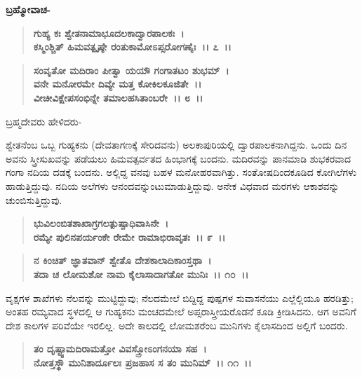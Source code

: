 \begin{flushleft}
\textbf{ಬ್ರಹ್ಮೋವಾಚ-}
\end{flushleft}

\begin{verse}
\textbf{ಗುಹ್ಯ ಕಃ ಶ್ವೇತನಾಮಾಭೂದಲಕಾದ್ವಾರಪಾಲಕಃ~।}\\\textbf{ಕಸ್ಮಿಂಶ್ಚಿತ್ ಹಿಮವತ್ಪೃಷ್ಠೇ ರಂತುಕಾಮೋಽಪ್ಸರೋಗಣೈಃ~।। ೭~।। }
\end{verse}

\begin{verse}
\textbf{ಸಂವೃತೋ ಮದಿರಾಂ ಪೀತ್ವಾ ಯಯೌ ಗಂಗಾತಟಂ ಶುಭಮ್~।}\\\textbf{ವನೇ ಮನೋರಮೇ ದಿವ್ಯೇ ಮತ್ತ ಕೋಕಿಲಕೂಜಿತೇ~।।}\\\textbf{ವೀಚೀವಿಕ್ಷೇಪಸಂಭಿನ್ನೇ ತಮಾಲಹಸಿತಾಂಬರೇ~।। ೮~।।}
\end{verse}

\begin{flushleft}
 ಬ್ರಹ್ಮದೇವರು ಹೇಳಿದರು-
\end{flushleft}

ಶ್ವೇತನೆಂಬ ಒಬ್ಬ ಗುಹ್ಯಕನು (ದೇವತಾಗಣಕ್ಕೆ ಸೇರಿದವನು) ಅಲಕಾಪುರಿಯಲ್ಲಿ ದ್ವಾರಪಾಲಕನಾಗಿದ್ದನು. ಒಂದು ದಿನ ಅವನು ಸ್ತ್ರೀಸುಖವನ್ನು ಪಡೆಯಲು ಹಿಮವತ್ಪರ್ವತದ ಹಿಂಭಾಗಕ್ಕೆ ಬಂದನು. ಮದಿರವನ್ನು ಪಾನಮಾಡಿ ಶುಭಕರವಾದ ಗಂಗಾ ನದಿಯ ದಡಕ್ಕೆ ಬಂದನು. ಅಲ್ಲಿದ್ದ ವನವು ಬಹಳ ಮನೋಹರವಾಗಿತ್ತು. ಸಂತೋಷದಿಂದಕೂಡಿದ ಕೋಗಿಲೆಗಳು ಹಾಡುತ್ತಿದ್ದುವು. ನದಿಯ ಅಲೆಗಳು ಆನಂದವನ್ನುಂಟುಮಾಡುತ್ತಿದ್ದುವು. ಅನೇಕ ವಿಧವಾದ ಮರಗಳು ಆಕಾಶವನ್ನು ಚುಂಬಿಸುತ್ತಿದ್ದುವು.

\begin{verse}
\textbf{ಭುವಿಲಂಬಿತಶಾಖಾಗ್ರಗಲತ್ಪುಷ್ಪಾಧಿವಾಸಿನೇ~।}\\\textbf{ರಮ್ಯೇ ಪುಲಿನಪರ್ಯಂಕೇ ರೇಮೇ ರಾಮಾಭಿರಾವೃತಃ~।। ೯~।। }
\end{verse}

\begin{verse}
\textbf{ನ ಕಿಂಚಿತ್ ಜ್ಞಾತವಾನ್ ಶ್ವೇತೊ ದೇಶಕಾಲಾದಿಕಾಂಸ್ತಥಾ~।}\\\textbf{ತದಾ ಚ ಲೋಮಶೋ ನಾಮ ಕೈಲಾಸಾದಾಗತೋ ಮುನಿಃ~।। ೧೦~।।}
\end{verse}

ವೃಕ್ಷಗಳ ಶಾಖೆಗಳು ನೆಲವನ್ನು ಮುಟ್ಟಿದ್ದುವು; ನೆಲದಮೇಲೆ ಬಿದ್ದಿದ್ದ ಪುಷ್ಪಗಳ ಸುವಾಸನೆಯು ಎಲ್ಲೆಲ್ಲಿಯೂ ಹರಡಿತ್ತು; ಅಂತಹ ರಮ್ಯವಾದ ಸ್ಥಳದಲ್ಲಿ ಆ ಗುಹ್ಯಕನು ಮಂಚದಮೇಲೆ ಅಪ್ಸರಾಸ್ತ್ರೀಯರೊಡನೆ ಕೂಡಿ ಕ್ರೀಡಿಸಿದನು. ಆಗ ಅವನಿಗೆ ದೇಶ ಕಾಲಗಳ ಪರಿವೆಯೇ ಇರಲಿಲ್ಲ. ಅದೇ ಕಾಲದಲ್ಲಿ ಲೋಮಶರೆಂಬ ಮುನಿಗಳು ಕೈಲಾಸದಿಂದ ಅಲ್ಲಿಗೆ ಬಂದರು.

\begin{verse}
\textbf{ತಂ ದೃಷ್ಟ್ವಾಮದಿರಾಮತ್ತೋ ವಿವಸ್ತ್ರೋಽಂಗನಯಾ ಸಹ~।}\\\textbf{ನೋತ್ತಸ್ಥೌ ಮುನಿಶಾರ್ದೂಲಃ ಪ್ರಜಹಾಸ ಸ ತಂ ಮುನಿಮ್~।। ೧೧~।।}
\end{verse}

